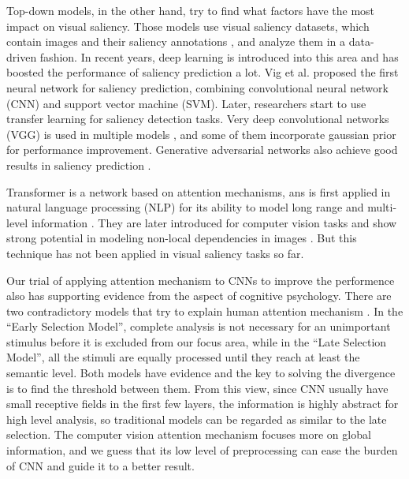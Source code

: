 \documentclass[12pt]{article}
\begin{document}
Top-down models, in the other hand, try to find what factors have the most impact on visual saliency. Those models use visual saliency datasets, which contain images and their saliency annotations
, and analyze them in a data-driven fashion.
In recent years, deep learning is introduced into this area and has boosted the performance of saliency prediction a lot.
Vig et al. \cite{vigLargeScaleOptimizationHierarchical2014} proposed the first neural network for saliency prediction, combining convolutional neural network (CNN) and support vector machine (SVM). Later, researchers start to use transfer learning for saliency 
detection tasks. Very deep convolutional networks (VGG) is used in multiple models \cite{kruthiventiDeepFixFullyConvolutional2015, kummererDeepGazeIIReading2016, corniaPredictingHumanEye2018}, and some of them incorporate gaussian prior for performance improvement.
Generative adversarial networks also achieve good results in saliency prediction \cite{panSalGANVisualSaliency2018, cheHowGazeInfluenced2020}.

Transformer is a network based on attention mechanisms, ans is first applied in natural language processing (NLP) for its ability to model long range and multi-level information \cite{bahdanauNeuralMachineTranslation2016a, vaswaniAttentionAllYou2017a}.
They are later introduced for computer vision tasks and show strong potential in modeling non-local dependencies in images \cite{zhangSelfAttentionGenerativeAdversarial2019a}.
But this technique has not been applied in visual saliency tasks so far.

Our trial of applying attention mechanism to CNNs to improve the performence also has supporting evidence from the aspect of cognitive psychology. There are two contradictory models that try to explain human attention mechanism \cite{gazzaniga2006cognitive}. 
In the “Early Selection Model”, complete analysis is not necessary for an unimportant stimulus before it is excluded from our focus area, while in the “Late Selection Model”, all the stimuli are equally processed until they reach at least the semantic level. 
Both models have evidence and the key to solving the divergence is to find the threshold between them. From this view, since CNN usually have small receptive fields in the first few layers, the information is highly abstract for high level analysis, so traditional models can be regarded as similar to the late selection. 
The computer vision attention mechanism focuses more on global information, and we guess that its low level of preprocessing can ease the burden of CNN and guide it to a better result.
\end{document}
